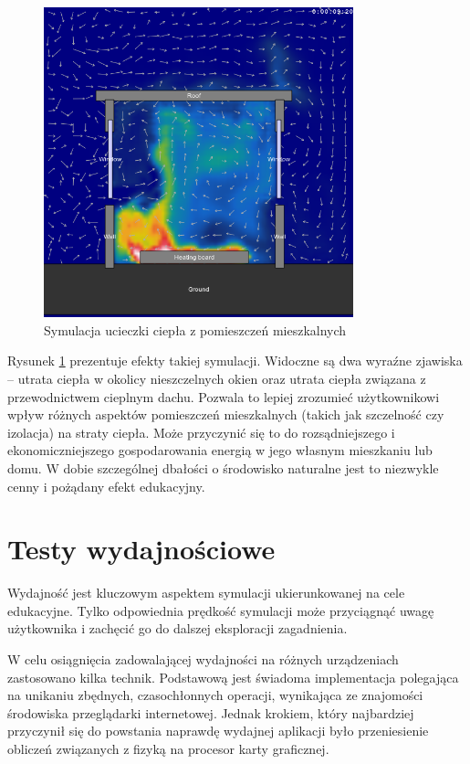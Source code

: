 \begin{figure}[!h]
\centering
\includegraphics[width=0.8\textwidth]{img/physics/wind}
\caption{Symulacja ucieczki ciepła z pomieszczeń mieszkalnych}
\label{fig:wind}
\end{figure}

Rysunek \ref{fig:wind} prezentuje efekty takiej symulacji. Widoczne są dwa
wyraźne zjawiska -- utrata ciepła w okolicy nieszczelnych okien oraz utrata
ciepła związana z przewodnictwem cieplnym dachu. Pozwala to lepiej zrozumieć
użytkownikowi wpływ różnych aspektów pomieszczeń mieszkalnych (takich jak
szczelność czy izolacja) na straty ciepła. Może przyczynić się to do
rozsądniejszego i ekonomiczniejszego gospodarowania energią w jego własnym
mieszkaniu lub domu. W dobie szczególnej dbałości o środowisko naturalne
jest to niezwykle cenny i pożądany efekt edukacyjny.

\section{Testy wydajnościowe}
\label{sec:testyWydajnosciowe}

Wydajność jest kluczowym aspektem symulacji ukierunkowanej na cele edukacyjne.
Tylko odpowiednia prędkość symulacji może przyciągnąć uwagę użytkownika i
zachęcić go do dalszej eksploracji zagadnienia.

W celu osiągnięcia zadowalającej wydajności na różnych urządzeniach zastosowano
kilka technik. Podstawową jest świadoma implementacja polegająca na unikaniu
zbędnych, czasochłonnych operacji, wynikająca ze znajomości środowiska
przeglądarki internetowej. Jednak krokiem, który najbardziej przyczynił się do
powstania naprawdę wydajnej aplikacji było przeniesienie obliczeń związanych
z fizyką na procesor karty graficznej.

